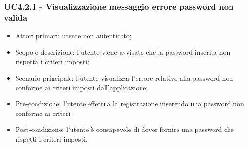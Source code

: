 \subsubsection{UC4.2.1 - Visualizzazione messaggio errore password non valida}
\begin{itemize}
	\item  Attori primari: utente non autenticato;
	\item  Scopo e descrizione: l'utente viene avvisato che la password inserita non rispetta i criteri imposti;
	\item  Scenario principale: l'utente visualizza l'errore relativo alla password non conforme ai criteri imposti dall'applicazione;
	\item  Pre-condizione: l'utente effettua la registrazione inserendo una password non conforme ai criteri;
	\item  Post-condizione: l'utente è consapevole di dover fornire una password che rispetti i criteri imposti.
\end{itemize}
